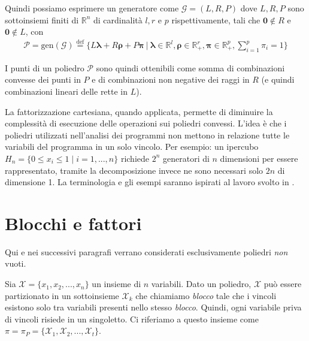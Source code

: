 \documentclass{mimosis}
\theoremstyle{definition}
\begin{document}
\begin{itemize}
\begin{itemize}
Quindi possiamo esprimere un generatore come \(\mathcal{G} =
    (\mathit{L},\mathit{R},\mathit{P})\) dove \(\mathit{L},\mathit{R},\mathit{P}\)
sono sottoinsiemi finiti di \(\mathbb{R}^n\) di cardinalità \(l,r\) e \(p\)
rispettivamente, tali che \(\bm{0} \notin \mathit{R}\) e \(\bm{0} \notin \mathit{L}\), con
\begin{align*}
\mathcal{P} = \text{gen}(\mathcal{G}) \stackrel{\text{def}}{=} \{\mathit{L}\bm{\lambda} + \mathit{R}\bm{\rho} + \mathit{P}\bm{\pi} \: | \:
\bm{\lambda} \in \mathbb{R}^l, \bm{\rho} \in \mathbb{R}^r_+, \bm{\pi} \in \mathbb{R}^p_+, \sum\limits_{i=1}^p \pi_i = 1\}
\end{align*}

I punti di un poliedro \(\mathcal{P}\) sono quindi ottenibili come somma di combinazioni
convesse dei punti in \(\mathit{P}\) e di combinazioni non negative
dei raggi in \(\mathit{R}\) (e quindi combinazioni lineari delle rette in \(\mathit{L}\)).
\end{itemize}
\end{itemize}

La fattorizzazione cartesiana, quando applicata, permette di diminuire la complessità di esecuzione
delle operazioni sui poliedri convessi. L'idea è che i poliedri
utilizzati nell'analisi dei programmi non mettono in relazione tutte le
variabili del programma in un solo vincolo. Per esempio: un ipercubo \\
\(H_n = \{0 \le x_i \le 1 \; | \; i = 1,...,n\}\)
richiede \(2^n\) generatori di \(n\) dimensioni per essere rappresentato, tramite la decomposizione
invece ne sono necessari solo \(2n\) di dimensione 1. La terminologia e gli esempi saranno
ispirati al lavoro svolto in \cite{fastpoly}.

\section{Blocchi e fattori}
\label{sec:org3eef7d6}
Qui e nei successivi paragrafi verrano considerati esclusivamente poliedri \emph{non}
vuoti.

Sia \(\mathcal{X} = \{x_1, x_2,..., x_n\}\) un insieme di \(n\) variabili. Dato un poliedro, \(\mathcal{X}\)
può essere partizionato in un sottoinsieme \(\mathcal{X}_k\) che chiamiamo \emph{blocco} tale
che i vincoli esistono solo tra variabili presenti nello stesso \emph{blocco}.
Quindi, ogni variabile priva di vincoli risiede in un singoletto. Ci riferiamo a
questo insieme come \(\pi = \pi_P = \{\mathcal{X}_1, \mathcal{X}_2,..., \mathcal{X}_t\}\).
\end{document}
